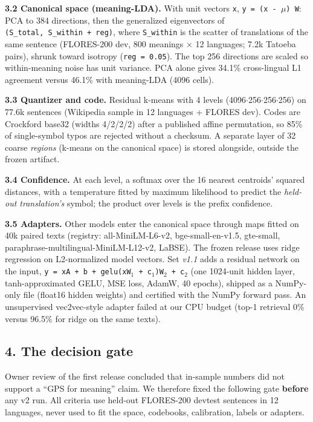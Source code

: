 \documentclass[
  10pt,
]{article}
\begin{document}
\textbf{3.2 Canonical space (meaning-LDA).} With unit vectors
\texttt{x}, \texttt{y\ =\ (x\ -\ $\mu$)\ W}: PCA to 384 directions, then the
generalized eigenvectors of \texttt{(S\_total,\ S\_within\ +\ reg)},
where \texttt{S\_within} is the scatter of translations of the same
sentence (FLORES-200 dev, 800 meanings $\times$ 12 languages; 7.2k Tatoeba
pairs), shrunk toward isotropy (\texttt{reg\ =\ 0.05}). The top 256
directions are scaled so within-meaning noise has unit variance. PCA
alone gives 34.1\% cross-lingual L1 agreement versus 46.1\% with
meaning-LDA (4096 cells).

\textbf{3.3 Quantizer and code.} Residual k-means with 4 levels
(4096$\cdot$256$\cdot$256$\cdot$256) on 77.6k sentences (Wikipedia sample in 12 languages
+ FLORES dev). Codes are Crockford base32 (widths 4/2/2/2) after a
published affine permutation, so 85\% of single-symbol typos are
rejected without a checksum. A separate layer of 32 coarse
\emph{regions} (k-means on the canonical space) is stored alongside,
outside the frozen artifact.

\textbf{3.4 Confidence.} At each level, a softmax over the 16 nearest
centroids' squared distances, with a temperature fitted by maximum
likelihood to predict the \emph{held-out translation's} symbol; the
product over levels is the prefix confidence.

\textbf{3.5 Adapters.} Other models enter the canonical space through
maps fitted on 40k paired texts (registry: all-MiniLM-L6-v2,
bge-small-en-v1.5, gte-small, paraphrase-multilingual-MiniLM-L12-v2,
LaBSE). The frozen release uses ridge regression on L2-normalized model
vectors. Set \emph{v1.1} adds a residual network on the input,
\texttt{y\ =\ xA\ +\ b\ +\ gelu(xW$_1$\ +\ c$_1$)W$_2$\ +\ c$_2$} (one 1024-unit
hidden layer, tanh-approximated GELU, MSE loss, AdamW, 40 epochs),
shipped as a NumPy-only file (float16 hidden weights) and certified with
the NumPy forward pass. An unsupervised vec2vec-style adapter failed at
our CPU budget (top-1 retrieval 0\% versus 96.5\% for ridge on the same
texts).

\hypertarget{the-decision-gate}{%
\subsection{4. The decision gate}\label{the-decision-gate}}

Owner review of the first release concluded that in-sample numbers did
not support a ``GPS for meaning'' claim. We therefore fixed the
following gate \textbf{before} any v2 run. All criteria use held-out
FLORES-200 devtest sentences in 12 languages, never used to fit the
space, codebooks, calibration, labels or adapters.
\end{document}
